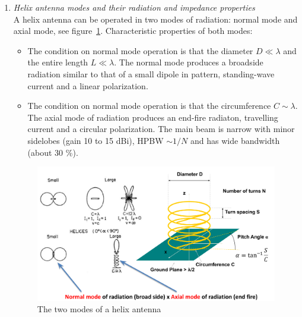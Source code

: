\documentclass[11pt,a4paper]{article}
\begin{document}
\begin{enumerate}
    \item \emph{Helix antenna modes and their radiation and impedance properties}\\
    A helix antenna can be operated in two modes of radiation: normal mode and axial mode, see figure~\ref{fig:helix-antenna}. Characteristic properties of both modes:
    \begin{itemize}
        \item The condition on normal mode operation is that the diameter $D \ll \lambda$ and the entire length $L \ll \lambda$. The normal mode produces a broadside radiation similar to that of a small dipole in pattern, standing-wave current and a linear polarization.
        \item The condition on normal mode operation is that the circumference $C \sim \lambda$. The axial mode of radiation produces an end-fire radiaton, travelling current and a circular polarization. The main beam is narrow with minor sidelobes (gain 10 to 15 dBi), HPBW $\sim 1/N$ and has wide bandwidth (about 30 \%).
    \end{itemize}
    \begin{figure}[!ht]
        \centering
        \includegraphics[width=.8\textwidth]{src/helix-antenna.png}
        \caption{\label{fig:helix-antenna}The two modes of a helix antenna}
    \end{figure}
    
\end{enumerate}
\end{document}
